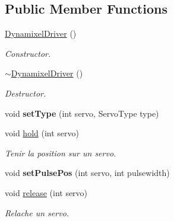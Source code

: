 \subsection*{Public Member Functions}
\begin{DoxyCompactItemize}
\item 
\mbox{\label{classDynamixelDriver_a6652b8534770759128aa2e77ddf4faa8}} 
\hyperlink{classDynamixelDriver_a6652b8534770759128aa2e77ddf4faa8}{Dynamixel\+Driver} ()
\begin{DoxyCompactList}\small\item\em Constructor. \end{DoxyCompactList}\item 
\mbox{\label{classDynamixelDriver_a647cc62e97cb55795cd685fa674c95a8}} 
\hyperlink{classDynamixelDriver_a647cc62e97cb55795cd685fa674c95a8}{$\sim$\+Dynamixel\+Driver} ()
\begin{DoxyCompactList}\small\item\em Destructor. \end{DoxyCompactList}\item 
\mbox{\label{classDynamixelDriver_a4b80dedb87fe1b129aae9a8f42c07850}} 
void {\bfseries set\+Type} (int servo, Servo\+Type type)
\item 
\mbox{\label{classDynamixelDriver_a158a5d3216643efd306c036eac270752}} 
void \hyperlink{classDynamixelDriver_a158a5d3216643efd306c036eac270752}{hold} (int servo)
\begin{DoxyCompactList}\small\item\em Tenir la position sur un servo. \end{DoxyCompactList}\item 
\mbox{\label{classDynamixelDriver_ab9d0e9a3d8ef54d7bd1fee238bfb5278}} 
void {\bfseries set\+Pulse\+Pos} (int servo, int pulsewidth)
\item 
\mbox{\label{classDynamixelDriver_a16fc2b6f82b30c98bab3d64079f16360}} 
void \hyperlink{classDynamixelDriver_a16fc2b6f82b30c98bab3d64079f16360}{release} (int servo)
\begin{DoxyCompactList}\small\item\em Relache un servo. \end{DoxyCompactList}\item 

\end{DoxyCompactItemize}
